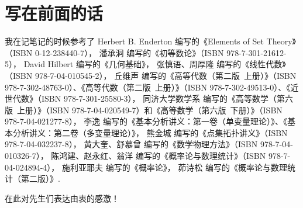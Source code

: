 \documentclass[UTF8,12pt]{ctexbook}
\title{\pdftitle}
\author{\pdfauthor}
\date{
Powered by \TeX \\
\today
}
\begin{document}


\chapter*{写在前面的话}
我在记笔记的时候参考了%
Herbert B. Enderton 编写的《Elements of Set Theory》（ISBN 0-12-238440-7），%
潘承洞 编写的《初等数论》（ISBN 978-7-301-21612-5），%
David Hilbert 编写的《几何基础》，%
张慎语、周厚隆 编写的《线性代数》（ISBN 978-7-04-010545-2），%
丘维声 编写的《高等代数（第二版\ 上册）》（ISBN 978-7-302-48763-0）、《高等代数（第二版\ 上册）》（ISBN 978-7-302-49513-0）、《近世代数》（ISBN 978-7-301-25580-3），%
同济大学数学系 编写的《高等数学（第六版\ 上册）》（ISBN 978-7-04-020549-7）和《高等数学（第六版\ 下册）》（ISBN 978-7-04-021277-8），%
李逸 编写的《基本分析讲义：第一卷（单变量理论）》、《基本分析讲义：第二卷（多变量理论）》，%
熊金城 编写的《点集拓扑讲义》（ISBN 978-7-04-032237-8），%
黄大奎、舒慕曾 编写的《数学物理方法》（ISBN 978-7-04-010326-7），%
陈鸿建、赵永红、翁洋 编写的《概率论与数理统计》（ISBN 978-7-04-024894-4），%
施利亚耶夫 编写的《概率论》，%
茆诗松 编写的《概率论与数理统计（第二版）》.

在此对先生们表达由衷的感激！

\frontmatter
{} %
\tableofcontents

\mainmatter
{} %

\let\oldchapter\chapter
\renewcommand\chapter{\cleardoublepage\oldchapter}
\let\oldsection\section
\renewcommand\section{\clearpage\oldsection}

\everymath{\displaystyle}

\def\v#1#2{%
\begingroup\ifnum0<0#2\relax{%
\setcounter{enumi}{1}%
{#1}_{\theenumi}%
\stepcounter{enumi}%
\whileboolexpr{not test{\ifnumcomp{\value{enumi}}>{#2}}}%
{%
,\allowbreak{#1}_{\theenumi}%
\stepcounter{enumi}%
}%
}%
\else%
{#1}_1,\allowbreak{#1}_2,\allowbreak\dotsc,\allowbreak{#1}_{#2}%
\fi\endgroup%
}%










\backmatter

\end{document}
